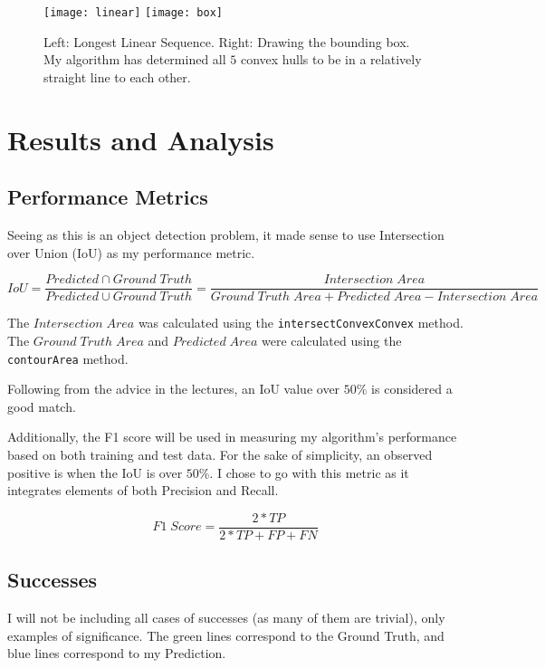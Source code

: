 \documentclass{article}  %
\begin{document}
	\begin{figure}[H]
		\centering
		\texttt{[image: linear]}
		\texttt{[image: box]}
		\caption{Left: Longest Linear Sequence. Right: Drawing the bounding box. My algorithm has determined all $5$ convex hulls to be in a relatively straight line to each other.}
	\end{figure}
	
	\section{Results and Analysis}
	
	\subsection*{Performance Metrics}
	
	Seeing as this is an object detection problem, it made sense to use Intersection over Union (IoU) as my performance metric.
	
	\[ IoU = \frac{Predicted \cap Ground\; Truth}{Predicted \cup Ground\; Truth} = \frac{Intersection\; Area}{Ground\; Truth\; Area + Predicted\; Area - Intersection\; Area} \]
	
	The $Intersection\; Area$ was calculated using the \verb|intersectConvexConvex| method. The $Ground\; Truth\; Area$ and $Predicted\; Area$ were calculated using the \verb|contourArea| method.
	
	Following from the advice in the lectures, an IoU value over $50\%$ is considered a good match.\newline
	
	Additionally, the F1 score will be used in measuring my algorithm's performance based on both training and test data. For the sake of simplicity, an observed positive is when the IoU is over $50\%$. I chose to go with this metric as it integrates elements of both Precision and Recall.
	
	\[ F1\; Score = \frac{2*TP}{2*TP+FP+FN} \]
	
	\subsection{Successes}
	
	I will not be including all cases of successes (as many of them are trivial), only examples of significance. The green lines correspond to the Ground Truth, and blue lines correspond to my Prediction.
	
	
\end{document}
